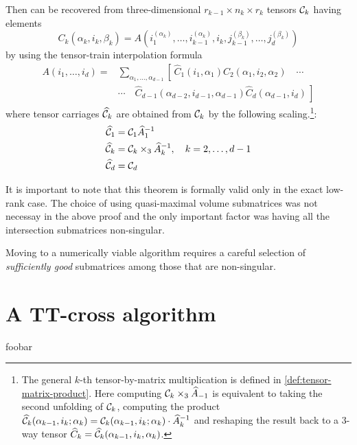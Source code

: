 \begin{Teo}
  Then \A can be recovered from three-dimensional $r_{k-1} \times n_k \times r_k$ tensors $\mathcal{C}_k$ having elements
  \begin{equation*}
    C_k(\alpha_k,i_k,\beta_k) = A(i_1^{(\alpha_k)},\ldots,i_{k-1}^{(\alpha_k)},i_k,j_{k-1}^{(\beta_k)},\ldots,j_d^{(\beta_k)})
  \end{equation*}
  by using the tensor-train interpolation formula
  \begin{align}
    A(i_1,\ldots,i_d) =& \sum_{\alpha_1,\ldots,\alpha_{d-1}} \left[ \, \hat{C}_1(i_1,\alpha_1) \hat{C}_2(\alpha_1,i_2,\alpha_2) \quad \cdots \right. \nonumber \\
    &\cdots \quad \left. \hat{C}_{d-1}(\alpha_{d-2},i_{d-1},\alpha_{d-1}) \hat{C}_d(\alpha_{d-1},i_d) \, \right]
  \end{align}
  where tensor carriages $\widehat{\mathcal{C}}_k$ are obtained from $\mathcal{C}_k$ by the following scaling.\footnote{The general $k$-th tensor-by-matrix multiplication is defined in \ref{def:tensor-matrix-product}. Here computing $\mathcal{C}_k \times_3 \widehat{A}_{-1}$ is equivalent to taking the second unfolding of $\mathcal{C}_k$, computing the product $\widehat{\mathcal{C}}_k(\alpha_{k-1},i_k;\alpha_k) = \mathcal{C}_k(\alpha_{k-1},i_k;\alpha_k) \cdot \widehat{A}_k^{-1}$ and reshaping the result back to a 3-way tensor $\widehat{C}_k = \widehat{\mathcal{C}}_k(\alpha_{k-1},i_k,\alpha_k)$.}:
  \begin{align}
    \widehat{\mathcal{C}}_1 &= \mathcal{C}_1 \widehat{A}_1^{-1} \nonumber \\
    \widehat{\mathcal{C}}_k &= \mathcal{C}_k \times_3 \widehat{A}_k^{-1}, \quad k = 2, \ldots, d-1 \\
    \widehat{\mathcal{C}}_d &= \mathcal{C}_d \nonumber
  \end{align}
\end{Teo}

It is important to note that this theorem is formally valid only in the exact low-rank case. The choice of using quasi-maximal volume submatrices was not necessay in the above proof and the only important factor was having all the intersection submatrices non-singular.

Moving to a numerically viable algorithm requires a careful selection of \emph{sufficiently good} submatrices among those that are non-singular.

\section{A TT-cross algorithm}
foobar


